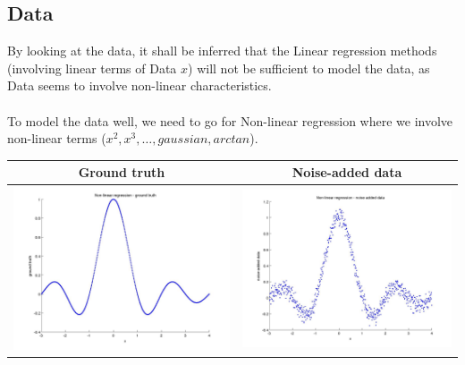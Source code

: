 \documentclass[fleqn]{article}
\begin{document}
\subsection{Data}
By looking at the data, it shall be inferred that the Linear regression methods (involving linear terms of Data $x$) will not be sufficient to model the data, as Data seems to involve non-linear characteristics.\\\\
To model the data well, we need to go for Non-linear regression where we involve non-linear terms ($x^2, x^3, \ldots, gaussian, arctan$). 
\begin{center}
  \begin{longtable}{ c | c }
	\multicolumn{1}{c}{Ground truth} & 
	\multicolumn{1}{c}{Noise-added data}  \\
    \hline
    \includegraphics[scale=0.2]{./pics/task4/ground_truth.jpg}  & \includegraphics[scale=0.2]{./pics/task4/noise_added_data.jpg} \\
    \hline
  \end{longtable}
\end{center}
\end{document}
